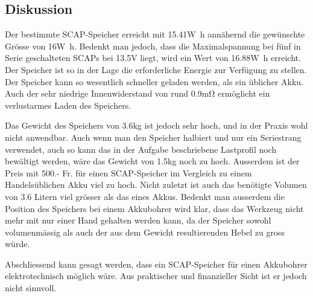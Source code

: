 \documentclass[a4,paper,fleqn]{article}
\begin{document}
\subsection{Diskussion}
Der bestimmte SCAP-Speicher erreicht mit 15.41\si{\watt\hour} annähernd die 
gewünschte Grösse von 16\si{\watt\hour}. Bedenkt man jedoch, dass die 
Maximalspannung bei fünf in Serie geschalteten SCAPs bei 13.5\si{\volt} liegt, 
wird ein Wert von 16.88\si{\watt\hour} erreicht. Der Speicher ist so in der 
Lage die erforderliche Energie zur Verfügung zu stellen. Der Speicher kann so 
wesentlich schneller geladen werden, als ein üblicher Akku. Auch der sehr 
niedrige Innenwiderstand von rund 0.9\si{\milli\ohm} ermöglicht ein 
verlustarmes Laden des Speichers.

\noindent
Das Gewicht des Speichers von 3.6\si{\kilogram} ist jedoch sehr hoch, und in 
der Praxis wohl nicht anwendbar. Auch wenn man den Speicher halbiert und nur 
ein Seriestrang verwendet, auch so kann das in der Aufgabe beschriebene 
Lastprofil noch bewältigt werden, wäre das Gewicht von 1.5\si{\kilogram} noch 
zu hoch. Ausserdem ist der Preis mit 500.- Fr. für einen SCAP-Speicher im 
Vergleich zu einem Handelsüblichen Akku viel zu hoch. Nicht zuletzt ist auch 
das benötigte Volumen von 3.6 Litern viel grösser als das eines Akkus. Bedenkt 
man ausserdem die Position des Speichers bei einem Akkubohrer wird klar, dass 
das Werkzeug nicht mehr mit nur einer Hand gehalten werden kann, da der 
Speicher sowohl volumenmässig als auch der aus dem Gewicht resultierenden 
Hebel zu gross würde.

\noindent
Abschliessend kann gesagt werden, dass ein SCAP-Speicher für einen Akkubohrer 
elektrotechnisch möglich wäre. Aus praktischer und finanzieller Sicht ist er 
jedoch nicht sinnvoll.
\end{document}
